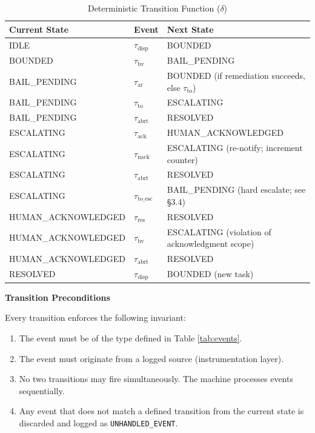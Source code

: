 \begin{table}[h]
  \centering
  \caption{Deterministic Transition Function ($\delta$)}
  \label{tab:transitions}
  \begin{tabular}{lll}
    \toprule
    \textbf{Current State} & \textbf{Event} & \textbf{Next State} \\
    \midrule
    IDLE                   & $\tau_{\text{disp}}$   & BOUNDED \\
    BOUNDED                & $\tau_{\text{bv}}$    & BAIL\_PENDING \\
    BAIL\_PENDING          & $\tau_{\text{ar}}$    & BOUNDED (if remediation succeeds, else $\tau_{\text{to}}$) \\
    BAIL\_PENDING          & $\tau_{\text{to}}$    & ESCALATING \\
    BAIL\_PENDING          & $\tau_{\text{abrt}}$  & RESOLVED \\
    ESCALATING             & $\tau_{\text{ack}}$   & HUMAN\_ACKNOWLEDGED \\
    ESCALATING             & $\tau_{\text{nack}}$  & ESCALATING (re-notify; increment counter) \\
    ESCALATING             & $\tau_{\text{abrt}}$  & RESOLVED \\
    ESCALATING             & $\tau_{\text{to\_esc}}$ & BAIL\_PENDING (hard escalate; see \S3.4) \\
    HUMAN\_ACKNOWLEDGED    & $\tau_{\text{res}}$   & RESOLVED \\
    HUMAN\_ACKNOWLEDGED    & $\tau_{\text{bv}}$    & ESCALATING (violation of acknowledgment scope) \\
    HUMAN\_ACKNOWLEDGED    & $\tau_{\text{abrt}}$  & RESOLVED \\
    RESOLVED               & $\tau_{\text{disp}}$  & BOUNDED (new task) \\
    \bottomrule
  \end{tabular}
\end{table}

\bigskip
\noindent\textbf{Transition Preconditions}

Every transition enforces the following invariant:

\begin{enumerate}
  \item The event must be of the type defined in Table \ref{tab:events}.
  \item The event must originate from a logged source (instrumentation layer).
  \item No two transitions may fire simultaneously. The machine processes events sequentially.
  \item Any event that does not match a defined transition from the current state is discarded and logged as \texttt{UNHANDLED\_EVENT}.
\end{enumerate}

